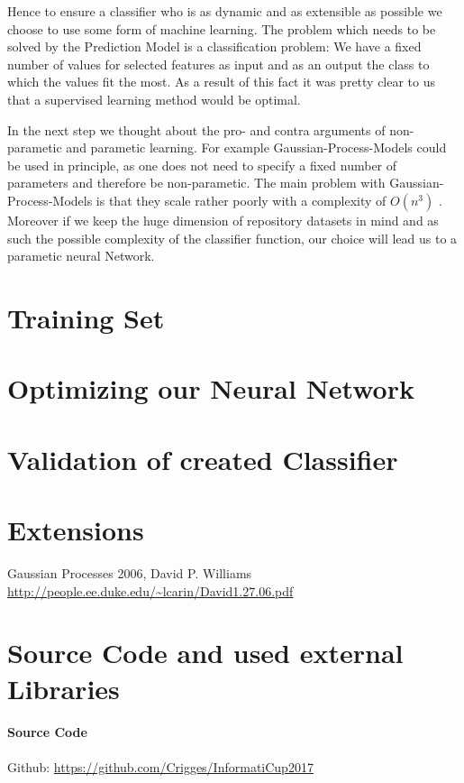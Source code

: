 \documentclass[paper=A4,pagesize=auto,13pt,headinclude=true,footinclude=true,BCOR=0mm,DIV=calc]{scrartcl}
\begin{document}
	Hence to  ensure a classifier who is as dynamic and as extensible as possible we choose to use some form of machine learning.
	The problem which needs to be solved by the Prediction Model is a classification problem: We have a fixed number of values for selected features as input and as an output the class to which the values fit the most. As a result of this fact it was pretty clear to us that a supervised learning method would be optimal.
	
	In the next step we thought about the pro- and contra arguments of non-parametic and parametic learning.
	For example Gaussian-Process-Models could be used in principle, as one does not need to specify a fixed number of parameters and therefore be non-parametic. 
	The main problem with Gaussian-Process-Models is that they scale rather poorly with a complexity of $O(n^{3})$ \cite{DukeUniversity}. Moreover if we keep the huge dimension of repository datasets in mind and as such the possible complexity of the classifier function, our choice will lead us to a parametic neural Network.
	
	
	
	
	
	\section{Training Set}
	
	\section{Optimizing our Neural Network }

	
	\section{Validation of created Classifier}
	
	\section{Extensions}
	
	
	
	\newpage
	
	\begin{thebibliography}{xxxxxx}
		 Gaussian Processes 2006, David P. Williams \url{http://people.ee.duke.edu/~lcarin/David1.27.06.pdf}
	\end{thebibliography}
	
	
	\section{Source Code and used external Libraries}
	\paragraph{Source Code}
	Github: \url{https://github.com/Crigges/InformatiCup2017}\\
\end{document}
